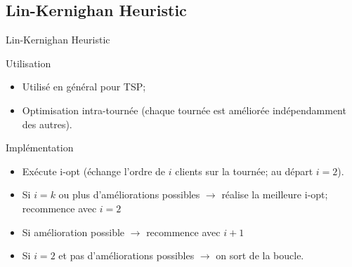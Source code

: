 \documentclass{beamer}
\begin{document}
\subsection{Lin-Kernighan Heuristic}
\begin{frame}{Lin-Kernighan Heuristic}

\begin{block}{Utilisation}
\begin{itemize}
\item Utilisé en général pour TSP;
\item Optimisation intra-tournée (chaque tournée est améliorée indépendamment des autres).
\end{itemize}
\end{block}

\begin{exampleblock}{Implémentation}
\begin{itemize}
\item Exécute i-opt (échange l'ordre de $i$ clients sur la tournée; au départ $i=2$).
\item Si $i=k$ ou plus d'améliorations possibles $\rightarrow$ réalise la meilleure i-opt; recommence avec $i=2$
\item Si amélioration possible $\rightarrow$ recommence avec $i+1$
\item Si $i=2$ et pas d'améliorations possibles $\rightarrow$ on sort de la boucle.
\end{itemize}
\end{exampleblock}

\end{frame} 
\end{document}
